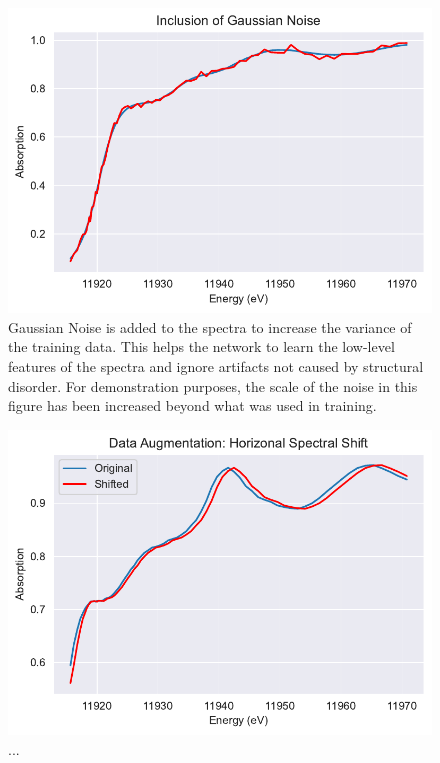 \begin{figure}
    \centering
    \includegraphics[width=\linewidth]{Chapters/Figures/gaussian-noise-data-aug.pdf}
    \caption[Data Augmentation: Gaussian Noise]{Gaussian Noise is added to the spectra to increase the variance of the training data. This helps the network to learn the low-level features of the spectra and ignore artifacts not caused by structural disorder. For demonstration purposes, the scale of the noise in this figure has been increased beyond what was used in training.}
    \label{fig:data-aug-gauss-noise}
\end{figure}

\begin{figure}
    \centering
    \includegraphics[width=\linewidth]{Chapters/Figures/data-aug-shift-pt75wieght.pdf}
    \caption[Data Augmentation: Horizontal Shift]{...}
    \label{fig:data-aug-hor}
\end{figure}

